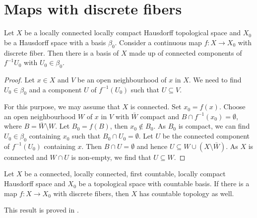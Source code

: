 \section{Maps with discrete fibers}

\begin{lemma}\label{lma-connectedcompofiberdim0basis}
    Let $X$ be a locally connected locally compact Hausdorff topological space and $X_0$ be a Hausdorff space with a basis $\beta_0$. Consider a continuous map $f:X\rightarrow X_0$ with discrete fiber. Then there is a basis of $X$ made up of connected components of $f^{-1}U_0$ with $U_0\in \beta_0$.
\end{lemma}
\begin{proof}
    Let $x\in X$ and $V$ be an open neighbourhood of $x$ in $X$. We need to find $U_0\in \beta_0$ and a component $U$ of $f^{-1}(U_0)$ such that $U\subseteq V$.
    
    For this purpose, we may assume that $X$ is connected. Set $x_0=f(x)$.
    Choose an open neighbourhood $W$ of $x$ in $V$ with $\bar{W}$ compact and $B\cap f^{-1}(x_0)=\emptyset$, where $B=\bar{W}\setminus W$. Let $B_0=f(B)$, then $x_0\not\in B_0$. As $B_0$ is compact, we can find $U_0\in \beta_0$ containing $x_0$ such that $B_0\cap U_0=\emptyset$. Let $U$ be the connected component of $f^{-1}(U_0)$ containing $x$. Then $B\cap U=\emptyset$ and hence $U\subseteq W\cup (X\setminus \bar{W})$. As $X$ is connected and $W\cap U$ is non-empty, we find that $U\subseteq W$.
\end{proof}

\begin{proposition}\label{prop-fiberdiscountablebasisinh}
    Let $X$ be a connected, locally connected, first countable, locally compact Hausdorff space and $X_0$ be a topological space with countable basis. If there is a map $f:X\rightarrow X_0$ with discrete fibers, then $X$ has countable topology as well.
\end{proposition}
This result is proved in \cite{Jur59}.

